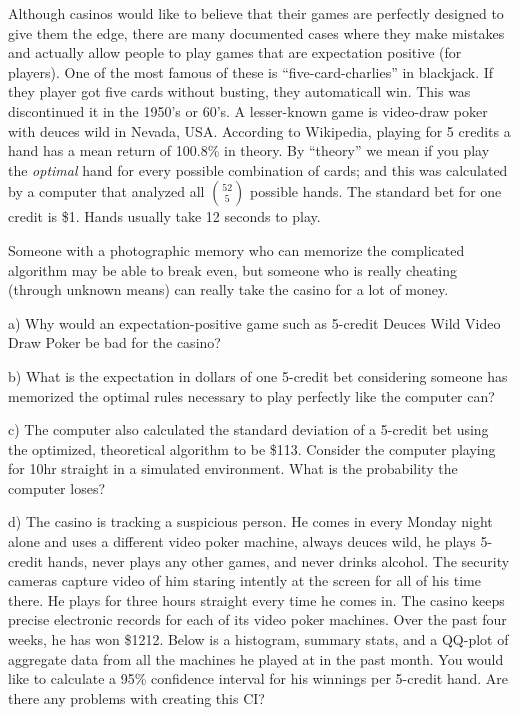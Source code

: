 \documentclass[12pt]{article}
\begin{document}
Although casinos would like to believe that their games are perfectly designed to give them the edge, there are many documented cases where they make mistakes and actually allow people to play games that are expectation positive (for players). One of the most famous of these is ``five-card-charlies'' in blackjack. If they player got five cards without busting, they automaticall win. This was discontinued it in the 1950's or 60's. A lesser-known game is  video-draw poker with deuces wild in Nevada, USA. According to Wikipedia, playing for 5 credits a hand has a mean return of 100.8\% in theory. By ``theory'' we mean if you play the \textit{optimal} hand for every possible combination of cards; and this was calculated by a computer that analyzed all $\binom{52}{5}$ possible hands. The standard bet for one credit is \$1. Hands usually take 12 seconds to play.

Someone with a photographic memory who can memorize the complicated algorithm may be able to break even, but someone who is really cheating (through unknown means) can really take the casino for a lot of money.

a) Why would an expectation-positive game such as 5-credit Deuces Wild Video Draw Poker be bad for the casino?

b) What is the expectation in dollars of one 5-credit bet considering someone has memorized the optimal rules necessary to play perfectly like the computer can?

c) The computer also calculated the standard deviation of a 5-credit bet using the optimized, theoretical algorithm to be \$113. Consider the computer playing for 10hr straight in a simulated environment. What is the probability the computer loses?

d) The casino is tracking a suspicious person. He comes in every Monday night alone and uses a different video poker machine, always deuces wild, he plays 5-credit hands, never plays any other games, and never drinks alcohol. The security cameras capture video of him staring intently at the screen for all of his time there. He plays for three hours straight every time he comes in. The casino keeps precise electronic records for each of its video poker machines. Over the past four weeks, he has won \$1212. Below is a histogram, summary stats, and a QQ-plot of aggregate data from all the machines he played at in the past month. You would like to calculate a 95\% confidence interval for his winnings per 5-credit hand. Are there any problems with creating this CI?
\end{document}

